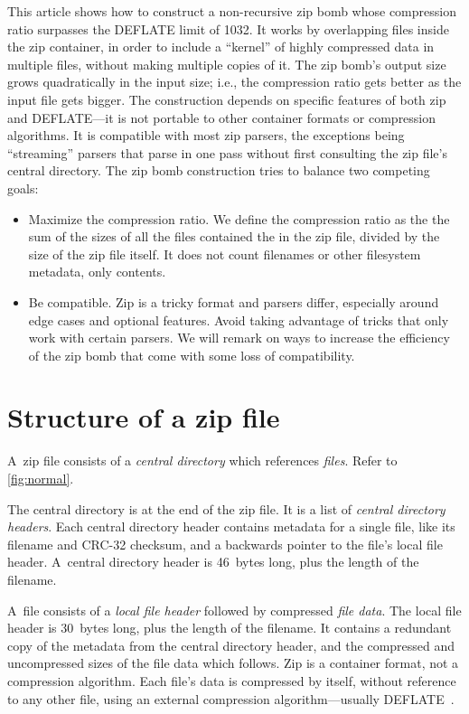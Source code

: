 \documentclass[letterpaper,twocolumn,10pt]{article}
\begin{document}
This article shows how to construct a non-recursive zip bomb
whose compression ratio surpasses the DEFLATE limit of 1032.
It works by overlapping files inside the zip container,
in order to include a ``kernel'' of highly compressed data
in multiple files, without making multiple copies of it.
The zip bomb's output size grows quadratically in the input size; i.e.,
the compression ratio gets better as the input file gets bigger.
The construction depends on specific features of both zip and DEFLATE---it
is not portable to other container formats or compression algorithms.
It is compatible with most zip parsers,
the exceptions being ``streaming'' parsers that
parse in one pass without first consulting the zip file's central directory.
The zip bomb construction tries to balance
two competing goals:
\begin{itemize}
\item
Maximize the compression ratio.
We define the compression ratio as the the sum of the sizes
of all the files contained the in the zip file,
divided by the size of the zip file itself.
It does not count filenames or other filesystem metadata,
only contents.
\item
Be compatible.
Zip is a tricky format and parsers differ, especially
around edge cases and optional features.
Avoid taking advantage of tricks that only work with certain parsers.
We will remark on ways to increase the efficiency of the zip bomb
that come with some loss of compatibility.
\end{itemize}


\section{Structure of a zip file}
\label{sec:zipstructure}

A~zip file consists of
a \emph{central directory} which references
\emph{files}.
Refer to \autoref{fig:normal}.

The central directory is at the end of the zip file.
It is a list of \emph{central directory headers}.
Each central directory header contains metadata for a single file,
like its filename and CRC-32 checksum,
and a backwards pointer to the file's local file header.
A~central directory header is 46~bytes long,
plus the length of the filename.

A~file consists of a \emph{local file header}
followed by compressed \emph{file data}.
The local file header is 30~bytes long,
plus the length of the filename.
It contains a redundant copy
of the metadata from the central directory header,
and the compressed and uncompressed sizes of the file data
which follows.
Zip is a container format, not a compression algorithm.
Each file's data is compressed by itself,
without reference to any other file,
using an external compression algorithm---usually DEFLATE~\cite{rfc1951}.
\end{document}
